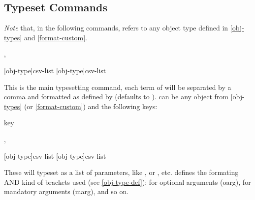 \documentclass{article}
\begin{document}
\subsection{Typeset Commands}\label{ts-commands}
\emph{Note} that, in the following commands,  refers to any object type defined in  \ref{obj-types} and \ref{format-custom}.

\begin{codedescribe}[code,update=2025/05/29]{\typesetobj,\tsobj}
\begin{codesyntax}
\tsmacro{\typesetobj}[obj-type]{csv-list}
\tsmacro{\tsobj}[obj-type]{csv-list}
\end{codesyntax}
This is the main typesetting command, each term of  will be separated by a comma and formatted as defined by  (defaults to ).  can be any object from \ref{obj-types} (or \ref{format-custom}) and the following keys:
\begin{describelist*}{key}
\end{describelist*}
\end{codedescribe}

%

\begin{codedescribe}[code]{\typesetargs,\tsargs}
\begin{codesyntax}
\tsmacro{\typesetargs}[obj-type]{csv-list}
\tsmacro{\tsargs}[obj-type]{csv-list}
\end{codesyntax}
 These will typeset  as a list of parameters, like , or , etc.  defines the formating AND kind of brackets used (see \ref{obj-type-def}): \tsverb{[]} for optional arguments (oarg), \tsverb{{}} for mandatory arguments (marg), and so on.
\end{codedescribe}
\end{document}

